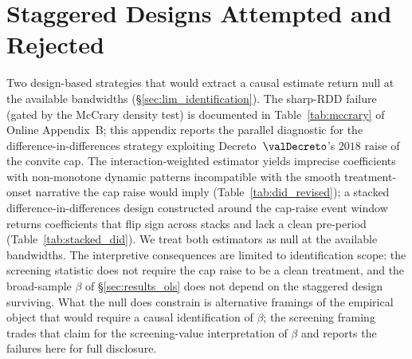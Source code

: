 \section{Staggered Designs Attempted and Rejected}
\label{app:staggered}

Two design-based strategies that would extract a causal estimate
return null at the available bandwidths
(\S\ref{sec:lim_identification}). The sharp-RDD failure (gated
by the McCrary density test) is documented in
Table~\ref{tab:mccrary} of Online Appendix~B; this appendix
reports the parallel diagnostic for the
difference-in-differences strategy exploiting
Decreto~$\valDecreto$'s $2018$ raise of the convite cap. The
\citet{sun2021estimating} interaction-weighted estimator yields
imprecise coefficients with non-monotone dynamic patterns
incompatible with the smooth treatment-onset narrative the cap
raise would imply (Table~\ref{tab:did_revised}); a stacked
difference-in-differences design constructed around the
cap-raise event window returns coefficients that flip sign
across stacks and lack a clean pre-period
(Table~\ref{tab:stacked_did}). We treat both estimators as null
at the available bandwidths. The interpretive consequences are
limited to identification scope: the screening statistic does
not require the cap raise to be a clean treatment, and the
broad-sample $\beta$ of \S\ref{sec:results_ols} does not depend
on the staggered design surviving. What the null does constrain
is alternative framings of the empirical object that would
require a causal identification of $\beta$; the screening framing
trades that claim for the screening-value interpretation of
$\beta$ and reports the failures here for full disclosure.




